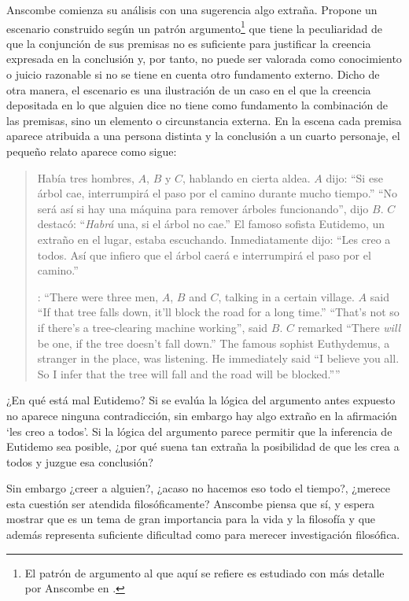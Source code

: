 Anscombe comienza su análisis con una sugerencia algo extraña. Propone un escenario construido según un patrón argumento\footnote{El patrón de argumento al que aquí se refiere es estudiado con más detalle por Anscombe en \cite{anscombe2015logic:qpa}.} que tiene la peculiaridad de que la conjunción de sus premisas no es suficiente para justificar la creencia expresada en la conclusión y, por tanto, no puede ser valorada como conocimiento o juicio razonable si no se tiene en cuenta otro fundamento externo. Dicho de otra manera, el escenario es una ilustración de un caso en el que la creencia depositada en lo que alguien dice no tiene como fundamento la combinación de las premisas, sino un elemento o circunstancia externa. En la escena cada premisa aparece atribuida a una persona distinta y la conclusión a un cuarto personaje, el pequeño relato aparece como sigue: \blockquote[{\cite[1]{anscombe2008faith:tobelieve}}: \enquote{There were three men, $A$, $B$ and $C$, talking in a certain village. $A$ said ``If that tree falls down, it'll block the road for a long time.'' ``That's not so if there's a tree-clearing machine working'', said $B$. $C$ remarked ``There \emph{will} be one, if the tree doesn't fall down.'' The famous sophist Euthydemus, a stranger in the place, was listening. He immediately said ``I believe you all. So I infer that the tree will fall and the road will be blocked.''}]{Había tres hombres, $A$, $B$ y $C$, hablando en cierta aldea. $A$ dijo: ``Si ese árbol cae, interrumpirá el paso por el camino durante mucho tiempo.'' ``No será así si hay una máquina para remover árboles funcionando'', dijo $B$. $C$ destacó: ``\emph{Habrá} una, si el árbol no cae.'' El famoso sofista Eutidemo, un extraño en el lugar, estaba escuchando. Inmediatamente dijo: ``Les creo a todos. Así que infiero que el árbol caerá e interrumpirá el paso por el camino.''}

¿En qué está mal Eutidemo? Si se evalúa la lógica del argumento antes expuesto no aparece ninguna contradicción, sin embargo hay algo extraño en la afirmación \enquote*{les creo a todos}. Si la lógica del argumento parece permitir que la inferencia de Eutidemo sea posible, ¿por qué suena tan extraña la posibilidad de que les crea a todos y juzgue esa conclusión?

Sin embargo ¿creer a alguien?, ¿acaso no hacemos eso todo el tiempo?, ¿merece esta cuestión ser atendida filosóficamente? Anscombe piensa que sí, y espera mostrar que es un tema de gran importancia para la vida y la filosofía y que además representa suficiente dificultad como para merecer investigación filosófica.

